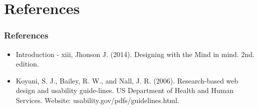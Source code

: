 \documentclass[11pt]{beamer}
\begin{document}
\section{References}
\begin{frame}
\frametitle{References}
\begin{itemize}
\item Introduction - xiii, Jhonson J. (2014). Designing with the Mind in mind. 2nd. edition.
\item Koyani,  S.  J.,  Bailey,  R.  W.,  and  Nall,  J.  R.  (2006). Research-based  web  design  and  usability  guide-lines. US Department of Health and Human Services. Website: usability.gov/pdfs/guidelines.html. 
\end{itemize}
\end{frame}
\end{document}

